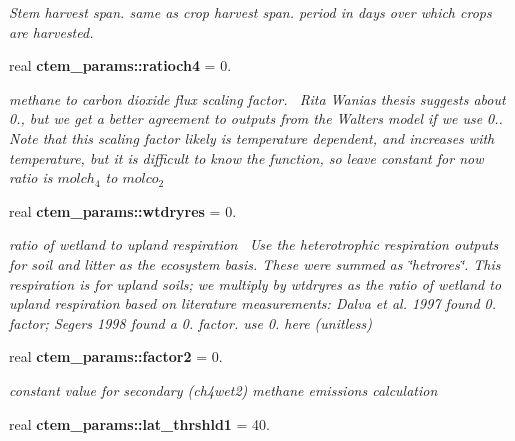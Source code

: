 \begin{DoxyCompactItemize}
\begin{DoxyCompactList}\small\item\em Stem harvest span. same as crop harvest span. period in days over which crops are harvested. \end{DoxyCompactList}\item 
\hypertarget{namespacectem__params_a34074497065d6cb2b9177c3fc400dcf3}{}real {\bfseries ctem\+\_\+params\+::ratioch4} = 0.\label{namespacectem__params_a34074497065d6cb2b9177c3fc400dcf3}

\begin{DoxyCompactList}\small\item\em methane to carbon dioxide flux scaling factor.~\newline
Rita Wania\textquotesingle{}s thesis suggests about 0., but we get a better agreement to outputs from the Walter\textquotesingle{}s model if we use 0.. Note that this scaling factor likely is temperature dependent, and increases with temperature, but it is difficult to know the function, so leave constant for now ratio is $mol ch_4$ to $mol co_2$ \end{DoxyCompactList}\item 
\hypertarget{namespacectem__params_a71227aca2a1e2963319a981847fa2874}{}real {\bfseries ctem\+\_\+params\+::wtdryres} = 0.\label{namespacectem__params_a71227aca2a1e2963319a981847fa2874}

\begin{DoxyCompactList}\small\item\em ratio of wetland to upland respiration~\newline
Use the heterotrophic respiration outputs for soil and litter as the ecosystem basis. These were summed as \char`\"{}hetrores\char`\"{}. This respiration is for upland soils; we multiply by wtdryres as the ratio of wetland to upland respiration based on literature measurements\+: Dalva et al. 1997 found 0. factor; Segers 1998 found a 0. factor. use 0. here (unitless) \end{DoxyCompactList}\item 
\hypertarget{namespacectem__params_aba1c91ff7281b9069ec03e8ecc581fef}{}real {\bfseries ctem\+\_\+params\+::factor2} = 0.\label{namespacectem__params_aba1c91ff7281b9069ec03e8ecc581fef}

\begin{DoxyCompactList}\small\item\em constant value for secondary (ch4wet2) methane emissions calculation \end{DoxyCompactList}\item 
\hypertarget{namespacectem__params_a3a63b83e7f97702b648861ae4a586b59}{}real {\bfseries ctem\+\_\+params\+::lat\+\_\+thrshld1} = 40.\label{namespacectem__params_a3a63b83e7f97702b648861ae4a586b59}


\end{DoxyCompactItemize}
